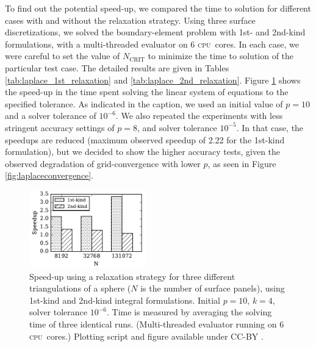 \documentclass[final,3p,times]{elsarticle}
\newcommand{\cpu}{\textsc{cpu}}
\newcommand{\ncrit}{N_{\text{CRIT}}}
\begin{document}
To find out the potential speed-up, we compared the time to solution for different cases with and without the relaxation strategy. Using three surface discretizations, we solved the boundary-element problem with 1st- and 2nd-kind formulations, with a multi-threaded evaluator on 6 \cpu\ cores. In each case, we were careful to set the value of $\ncrit$ to minimize the time to solution of the particular test case. 
The detailed results are given in Tables \ref{tab:laplace_1st_relaxation} and \ref{tab:laplace_2nd_relaxation}.
Figure \ref{fig:relaxation_timing} shows the speed-up in the time spent solving the linear system of equations to the specified tolerance. 
As indicated in the caption, we used an initial value of $p=10$ and a solver tolerance of $10^{-6}$.
We also repeated the experiments with less stringent accuracy settings of $p=8$, and solver tolerance $10^{-5}$. In that case, the speedups are reduced (maximum observed speedup of 2.22 for the 1st-kind formulation), but we decided to show the higher accuracy tests, given the observed degradation of grid-convergence with lower $p$, as seen in Figure \ref{fig:laplaceconvergence}.


\begin{figure}%
	\centering
	\includegraphics[natwidth=3in,natheight=2in,width=0.45\textwidth]{LaplaceSpeedupRelaxation.pdf}
	\caption{Speed-up using a relaxation strategy for three different triangulations of a sphere ($N$ is the number of surface panels), using 1st-kind and 2nd-kind integral formulations. Initial $p=10$, $k=4$, solver tolerance $10^{-6}$. Time is measured by averaging the solving time of three identical runs. (Multi-threaded evaluator running on 6 \cpu\ cores.) Plotting script and figure available under CC-BY \cite{WangLaytonBarba2016-figshare2}.}
	\label{fig:relaxation_timing}
\end{figure}
\end{document}
